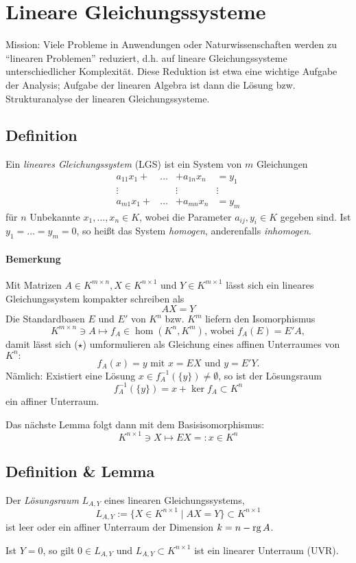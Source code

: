 \section{Lineare Gleichungssysteme}
 Mission: Viele Probleme in Anwendungen oder Naturwissenschaften werden zu "`linearen Problemen"' reduziert, d.h. auf lineare Gleichungssysteme unterschiedlicher Komplexität.
 Diese Reduktion ist etwa eine wichtige Aufgabe der Analysis; Aufgabe der linearen Algebra ist dann die Lösung bzw. Strukturanalyse der linearen Gleichungssysteme.
 \subsection{Definition}
 	\begin{Definition}
 		Ein \emph{lineares Gleichungssystem} (LGS) ist ein System von $ m $ Gleichungen
 		\[
 			\begin{array}{cccc}\tag{$\star\star$}
 				a_{11}x_1+  & \dots & + a_{1n}x_n & =y_1   \\
 				\vdots      &       & \vdots      & \vdots \\
 				a_{m1}x_1 + & \dots & +a_{mn}x_n  & = y_m
 			\end{array}
 		\]
 		für $ n $ Unbekannte $ x_1,\dots,x_n\in K $, wobei die Parameter $ a_{ij},y_i\in K $ gegeben sind. Ist $ y_1 = \dots = y_m = 0 $, so heißt das System \emph{homogen}, anderenfalls \emph{inhomogen}.
 	\end{Definition}
 	\paragraph{Bemerkung}
 		Mit Matrizen $ A\in K^{m\times n},X\in K^{n\times 1} $ und $ Y\in K^{m\times 1} $ lässt sich ein lineares Gleichungssystem kompakter schreiben als
 		\[
 			AX = Y \tag{$\star$}
 		\]
 		Die Standardbasen $ E $ und $ E' $ von $ K^n $ bzw. $ K^m $ liefern den Isomorphismus
 		\[
 			K^{m\times n}\ni A\mapsto f_A\in \hom(K^n,K^m)\text{, wobei }f_A(E) = E'A,
 		\]
 		damit lässt sich ($\star$) umformulieren als Gleichung eines affinen Unterraumes von $ K^n: $
 		\[
 			f_A(x) = y \text{ mit } x=EX \text{ und } y=E'Y.
 		\]
 		Nämlich: Existiert eine Lösung $ x\in f_A^{-1}(\{y\})\neq \emptyset $, so ist der Lösungsraum
 		\[
 			f_A^{-1}(\{y\}) = x+\ker f_A\subset K^n
 		\]
 		ein affiner Unterraum.

 		Das nächste Lemma folgt dann mit dem Basisisomorphismus:
 		\[
 			K^{n\times 1} \ni X \mapsto EX =: x\in K^n
 		\]
 \subsection{Definition \& Lemma}
 	\begin{Lemma}[Lösungsraum]
 		Der \emph{Lösungsraum} $ L_{A,Y} $ eines linearen Gleichungssystems,
 		\[
 			L_{A,Y}:=\{X\in K^{n\times 1}\mid AX=Y\}\subset K^{n\times 1}
 		\]
 		ist leer oder ein affiner Unterraum der Dimension $ k = n-\operatorname{rg} A $.

 		Ist $ Y = 0 $, so gilt $ 0\in L_{A,Y} $ und $ L_{A,Y}\subset K^{n\times 1} $ ist ein linearer Unterraum (UVR).
 	\end{Lemma}

